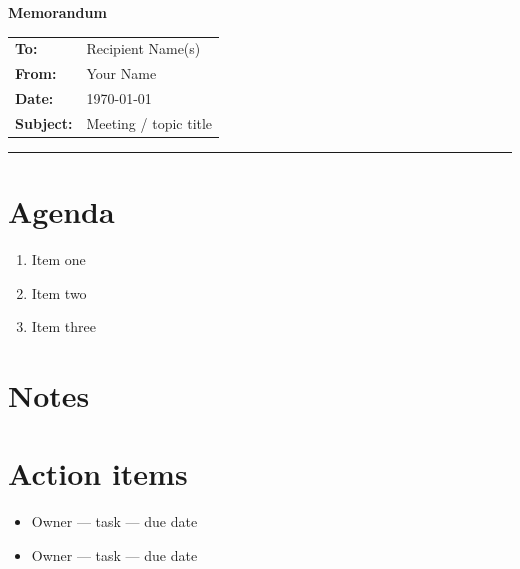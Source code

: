 \documentclass[11pt]{article}
\begin{document}
\begin{center}
{\LARGE\bfseries Memorandum}
\end{center}

\noindent
\begin{tabular}{@{}ll@{}}
\textbf{To:} & Recipient Name(s) \\
\textbf{From:} & Your Name \\
\textbf{Date:} & \today \\
\textbf{Subject:} & Meeting / topic title \\
\end{tabular}

\vspace{1em}
\hrule
\vspace{1em}

\section*{Agenda}
\begin{enumerate}[leftmargin=*]
  \item Item one
  \item Item two
  \item Item three
\end{enumerate}

\section*{Notes}

\section*{Action items}
\begin{itemize}[leftmargin=*]
  \item [ ] Owner — task — due date
  \item [ ] Owner — task — due date
\end{itemize}
\end{document}
